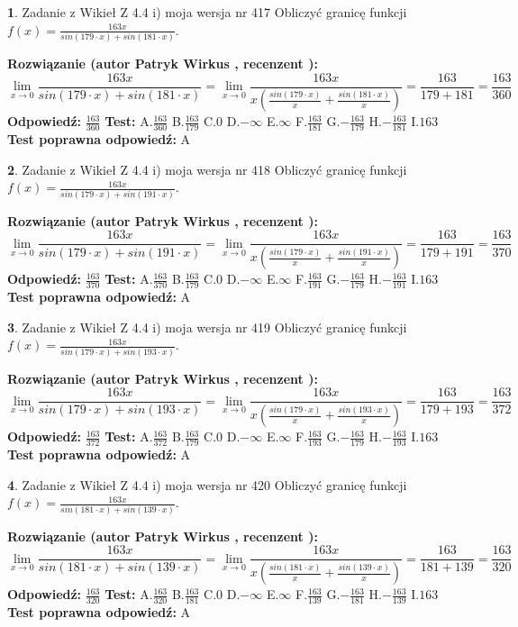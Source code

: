 \documentclass[12pt, a4paper]{article}
\theoremstyle{definition} %
\newtheorem{zad}{}
\newcommand{\zadStart}[1]{\begin{zad}#1\newline}
\newcommand{\zadStop}{\end{zad}}
\newcommand{\rozwStart}[2]{\noindent \textbf{Rozwiązanie (autor #1 , recenzent #2): }\newline}
\newcommand{\rozwStop}{\newline}
\newcommand{\odpStart}{\noindent \textbf{Odpowiedź:}\newline}
\newcommand{\odpStop}{\newline}
\newcommand{\testStart}{\noindent \textbf{Test:}\newline}
\newcommand{\testStop}{\newline}
\newcommand{\kluczStart}{\noindent \textbf{Test poprawna odpowiedź:}\newline}
\newcommand{\kluczStop}{\newline}
\begin{document}
\zadStart{Zadanie z Wikieł Z 4.4 i) moja wersja nr 417}
Obliczyć granicę funkcji $f(x)=\frac{163x}{sin(179\cdot x) +sin(181\cdot x)}$.
\zadStop
\rozwStart{Patryk Wirkus}{}
$$\lim\limits_{x\to 0}\frac{163x}{sin(179\cdot x) +sin(181\cdot x)}=\lim\limits_{x\to 0}\frac{163x}{x(\frac{sin(179\cdot x)}{x}+\frac{sin(181\cdot x)}{x})}=\frac{163}{179+181} = \frac{163}{360}$$
\rozwStop
\odpStart
$\frac{163}{360}$
\odpStop
\testStart
A.$\frac{163}{360}$
B.$\frac{163}{179}$
C.$0$
D.$-\infty$
E.$\infty$
F.$\frac{163}{181}$
G.$-\frac{163}{179}$
H.$-\frac{163}{181}$
I.$163$
\testStop
\kluczStart
A
\kluczStop



\zadStart{Zadanie z Wikieł Z 4.4 i) moja wersja nr 418}
Obliczyć granicę funkcji $f(x)=\frac{163x}{sin(179\cdot x) +sin(191\cdot x)}$.
\zadStop
\rozwStart{Patryk Wirkus}{}
$$\lim\limits_{x\to 0}\frac{163x}{sin(179\cdot x) +sin(191\cdot x)}=\lim\limits_{x\to 0}\frac{163x}{x(\frac{sin(179\cdot x)}{x}+\frac{sin(191\cdot x)}{x})}=\frac{163}{179+191} = \frac{163}{370}$$
\rozwStop
\odpStart
$\frac{163}{370}$
\odpStop
\testStart
A.$\frac{163}{370}$
B.$\frac{163}{179}$
C.$0$
D.$-\infty$
E.$\infty$
F.$\frac{163}{191}$
G.$-\frac{163}{179}$
H.$-\frac{163}{191}$
I.$163$
\testStop
\kluczStart
A
\kluczStop



\zadStart{Zadanie z Wikieł Z 4.4 i) moja wersja nr 419}
Obliczyć granicę funkcji $f(x)=\frac{163x}{sin(179\cdot x) +sin(193\cdot x)}$.
\zadStop
\rozwStart{Patryk Wirkus}{}
$$\lim\limits_{x\to 0}\frac{163x}{sin(179\cdot x) +sin(193\cdot x)}=\lim\limits_{x\to 0}\frac{163x}{x(\frac{sin(179\cdot x)}{x}+\frac{sin(193\cdot x)}{x})}=\frac{163}{179+193} = \frac{163}{372}$$
\rozwStop
\odpStart
$\frac{163}{372}$
\odpStop
\testStart
A.$\frac{163}{372}$
B.$\frac{163}{179}$
C.$0$
D.$-\infty$
E.$\infty$
F.$\frac{163}{193}$
G.$-\frac{163}{179}$
H.$-\frac{163}{193}$
I.$163$
\testStop
\kluczStart
A
\kluczStop



\zadStart{Zadanie z Wikieł Z 4.4 i) moja wersja nr 420}
Obliczyć granicę funkcji $f(x)=\frac{163x}{sin(181\cdot x) +sin(139\cdot x)}$.
\zadStop
\rozwStart{Patryk Wirkus}{}
$$\lim\limits_{x\to 0}\frac{163x}{sin(181\cdot x) +sin(139\cdot x)}=\lim\limits_{x\to 0}\frac{163x}{x(\frac{sin(181\cdot x)}{x}+\frac{sin(139\cdot x)}{x})}=\frac{163}{181+139} = \frac{163}{320}$$
\rozwStop
\odpStart
$\frac{163}{320}$
\odpStop
\testStart
A.$\frac{163}{320}$
B.$\frac{163}{181}$
C.$0$
D.$-\infty$
E.$\infty$
F.$\frac{163}{139}$
G.$-\frac{163}{181}$
H.$-\frac{163}{139}$
I.$163$
\testStop
\kluczStart
A
\kluczStop
\end{document}
